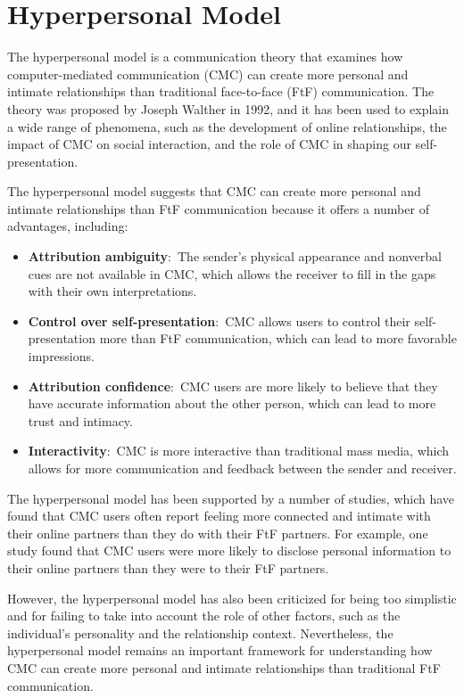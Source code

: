 \documentclass[
]{book}
\begin{document}
\section{Hyperpersonal Model}\label{hyperpersonal-model}

The hyperpersonal model is a communication theory that examines how computer-mediated communication (CMC) can create more personal and intimate relationships than traditional face-to-face (FtF) communication. The theory was proposed by Joseph Walther in 1992, and it has been used to explain a wide range of phenomena, such as the development of online relationships, the impact of CMC on social interaction, and the role of CMC in shaping our self-presentation.

The hyperpersonal model suggests that CMC can create more personal and intimate relationships than FtF communication because it offers a number of advantages, including:

\begin{itemize}
\item
  \textbf{Attribution ambiguity}:~The sender's physical appearance and nonverbal cues are not available in CMC, which allows the receiver to fill in the gaps with their own interpretations.
\item
  \textbf{Control over self-presentation}:~CMC allows users to control their self-presentation more than FtF communication, which can lead to more favorable impressions.
\item
  \textbf{Attribution confidence}:~CMC users are more likely to believe that they have accurate information about the other person, which can lead to more trust and intimacy.
\item
  \textbf{Interactivity}:~CMC is more interactive than traditional mass media, which allows for more communication and feedback between the sender and receiver.
\end{itemize}

The hyperpersonal model has been supported by a number of studies, which have found that CMC users often report feeling more connected and intimate with their online partners than they do with their FtF partners. For example, one study found that CMC users were more likely to disclose personal information to their online partners than they were to their FtF partners.

However, the hyperpersonal model has also been criticized for being too simplistic and for failing to take into account the role of other factors, such as the individual's personality and the relationship context. Nevertheless, the hyperpersonal model remains an important framework for understanding how CMC can create more personal and intimate relationships than traditional FtF communication.
\end{document}
